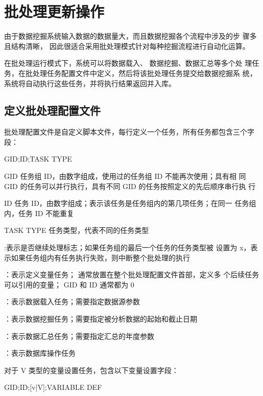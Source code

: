 \section{批处理更新操作}
由于数据挖掘系统输入数据的数据量大，而且数据挖掘各个流程中涉及的步
骤多且结构清晰， 因此很适合采用批处理模式针对每种挖掘流程进行自动化运算。

在批处理运行模式下，系统可以将数据载入、 数据挖掘、数据汇总等多个处
理任务，在批处理任务配置文件中定义，然后将该批处理任务提交给数据挖掘系
统，系统将自动执行这些任务，并将执行结果返回并入库。

\subsection{定义批处理配置文件}
批处理配置文件是自定义脚本文件，每行定义一个任务，所有任务都包含三个字段：

\begin{scriptcode}
GID;ID;TASK TYPE
\end{scriptcode}

\begin{para}
\item[GID] 任务组 ID，由数字组成，使用过的任务组 ID 不能再次使用；具有相
同 GID 的任务可以并行执行，具有不同 GID 的任务按照定义的先后顺序串行执
行
\item[ID] 任务 ID，由数字组成；表示该任务是任务组内的第几项任务；在同一
任务组内，任务 ID 不能重复
\item[TASK TYPE] 任务类型，代表不同的任务类型
\begin{cit}
\item {}:表示是否继续处理标志；如果任务组的最后一个任务的任务类型被
设置为 x，表示如果任务组内有任务执行失败，则中断整个批处理的执行
\item {}：表示定义变量任务； 通常放置在整个批处理配置文件首部，定义多
个后续任务可以引用的变量； GID 和 ID 通常都为 0
\item {}：表示数据载入任务；需要指定数据源参数
\item {}：表示数据挖掘任务；需要指定被分析数据的起始和截止日期
\item {}：表示数据汇总任务；需要指定汇总的年度参数
\item {}：表示数据库操作任务
\end{cit}
\end{para}

对于 V 类型的变量设置任务，包含以下变量设置字段：
\begin{scriptcode}
GID;ID;[v|V];VARIABLE DEF
\end{scriptcode}

